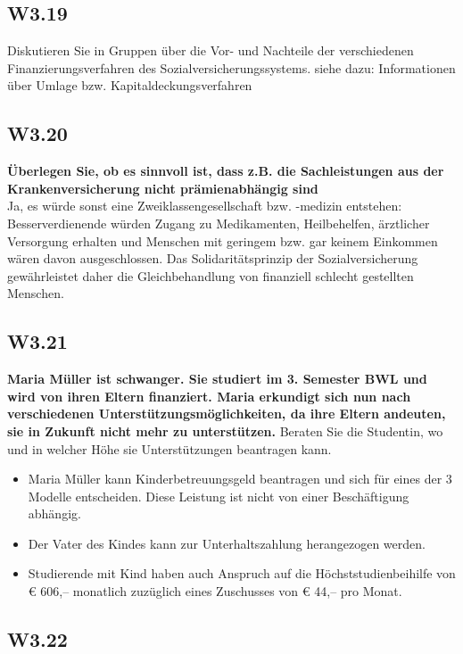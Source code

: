 	\subsection{W3.19}
		 Diskutieren Sie in Gruppen über die Vor- und Nachteile der verschiedenen Finanzierungsverfahren des Sozialversicherungssystems.
		 siehe dazu: Informationen über Umlage bzw. Kapitaldeckungsverfahren 
	
	\subsection{W3.20}
		\textbf{Überlegen Sie, ob es sinnvoll ist, dass z.B. die Sachleistungen aus der Krankenversicherung nicht prämienabhängig
			sind} \\
		 Ja, es würde sonst eine Zweiklassengesellschaft bzw. -medizin entstehen: Besserverdienende würden
		 Zugang zu Medikamenten, Heilbehelfen, ärztlicher Versorgung erhalten und Menschen mit geringem bzw. gar keinem
		 Einkommen wären davon ausgeschlossen. Das Solidaritätsprinzip der Sozialversicherung gewährleistet daher die Gleichbehandlung
		 von finanziell schlecht gestellten Menschen.
	
	\subsection{W3.21}
	
		\textbf{Maria Müller ist schwanger. Sie studiert im 3. Semester BWL und wird von ihren Eltern finanziert. Maria erkundigt
			sich nun nach verschiedenen Unterstützungsmöglichkeiten, da ihre Eltern andeuten, sie in Zukunft nicht mehr zu
			unterstützen.} Beraten Sie die Studentin, wo und in welcher Höhe sie Unterstützungen beantragen kann.
		\begin{itemize}
			\item Maria Müller kann Kinderbetreuungsgeld beantragen und sich für eines der 3 Modelle entscheiden. Diese Leistung ist
			nicht von einer Beschäftigung abhängig.
			\item Der Vater des Kindes kann zur Unterhaltszahlung herangezogen werden.
			\item Studierende mit Kind haben auch Anspruch auf die Höchststudienbeihilfe von € 606,– monatlich zuzüglich eines Zuschusses
			von € 44,– pro Monat.
		\end{itemize}
		
	\subsection{W3.22}
	
